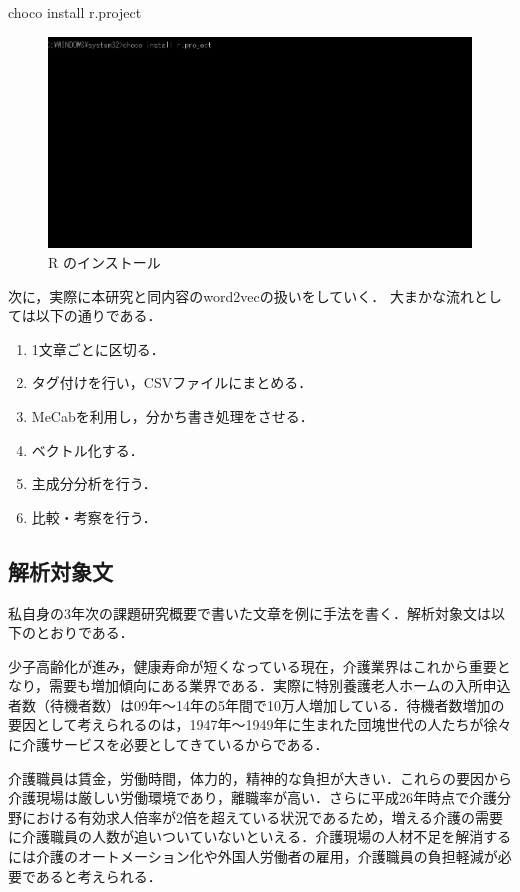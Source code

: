 choco install r.project

\begin{figure}[htb]
\centering
\includegraphics[width=13cm]{4-31.png}
\caption{R のインストール}\label{4-31}
\end{figure}
\newpage

次に，実際に本研究と同内容のword2vecの扱いをしていく．
大まかな流れとしては以下の通りである．
\begin{enumerate}
 \item 1文章ごとに区切る．
 \item タグ付けを行い，CSVファイルにまとめる．
 \item MeCabを利用し，分かち書き処理をさせる．
 \item ベクトル化する．
 \item 主成分分析を行う．
 \item 比較・考察を行う．
\end{enumerate}
\newpage

\subsection{解析対象文}

私自身の3年次の課題研究概要で書いた文章を例に手法を書く．解析対象文は以下のとおりである．

少子高齢化が進み，健康寿命が短くなっている現在，介護業界はこれから重要となり，需要も増加傾向にある業界である．実際に特別養護老人ホームの入所申込者数（待機者数）は09年～14年の5年間で10万人増加している．待機者数増加の要因として考えられるのは，1947年～1949年に生まれた団塊世代の人たちが徐々に介護サービスを必要としてきているからである．

介護職員は賃金，労働時間，体力的，精神的な負担が大きい．これらの要因から介護現場は厳しい労働環境であり，離職率が高い．さらに平成26年時点で介護分野における有効求人倍率が2倍を超えている状況であるため，増える介護の需要に介護職員の人数が追いついていないといえる．介護現場の人材不足を解消するには介護のオートメーション化や外国人労働者の雇用，介護職員の負担軽減が必要であると考えられる．

